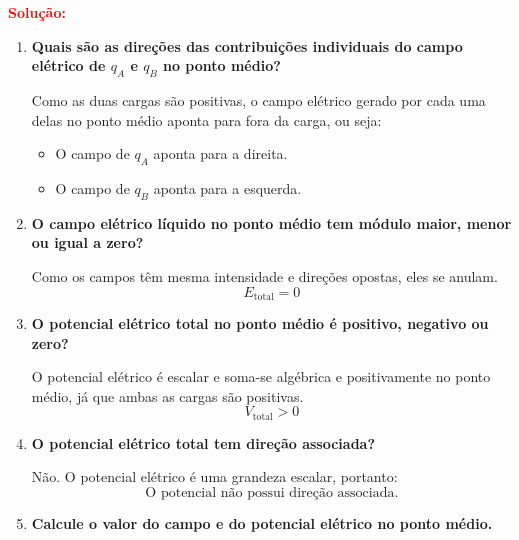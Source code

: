 \documentclass[a4paper,12pt]{article}
\begin{document}
\begin{flushleft}
\begin{center}
\begin{tikzpicture}[scale=1.5, >=stealth]
    \end{tikzpicture}
\end{center}

\textcolor{red}{\textbf{Solução:}}\\

\begin{enumerate}
    \item \textbf{Quais são as direções das contribuições individuais do campo elétrico de \( q_A \) e \( q_B \) no ponto médio?}
    
    Como as duas cargas são positivas, o campo elétrico gerado por cada uma delas no ponto médio aponta para fora da carga, ou seja:
    \begin{itemize}
        \item O campo de \( q_A \) aponta para a direita.
        \item O campo de \( q_B \) aponta para a esquerda.
    \end{itemize}
    
    \item \textbf{O campo elétrico líquido no ponto médio tem módulo maior, menor ou igual a zero?}
    
    Como os campos têm mesma intensidade e direções opostas, eles se anulam.
    \begin{equation}
    \boxed{E_{\text{total}} = 0}
    \end{equation}
    
    \item \textbf{O potencial elétrico total no ponto médio é positivo, negativo ou zero?}
    
    O potencial elétrico é escalar e soma-se algébrica e positivamente no ponto médio, já que ambas as cargas são positivas.
    \begin{equation}
    \boxed{V_{\text{total}} > 0}
    \end{equation}
    
    \item \textbf{O potencial elétrico total tem direção associada?}
    
    Não. O potencial elétrico é uma grandeza escalar, portanto:
    \begin{equation}
    \boxed{\text{O potencial não possui direção associada.}}
    \end{equation}
    
    \item \textbf{Calcule o valor do campo e do potencial elétrico no ponto médio.}
    

\end{enumerate}
\end{flushleft}
\end{document}
